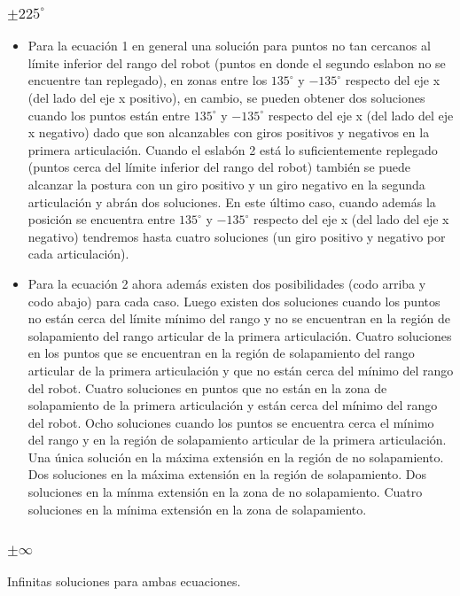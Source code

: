 \documentclass[a4paper,12pt]{article}
\begin{document}
\subsubsection{$\pm 225^\circ$}

\begin{itemize}
    \item Para la ecuación 1 en general una solución para puntos no tan cercanos al límite inferior del rango del robot (puntos en donde el segundo eslabon no se encuentre tan replegado), en zonas entre los $135^\circ$ y $-135^\circ$ respecto del eje x (del lado del eje x positivo), en cambio, se pueden obtener dos soluciones cuando los puntos están entre $135^\circ$ y $-135^\circ$ respecto del eje x (del lado del eje x negativo) dado que son alcanzables con giros positivos y negativos en la primera articulación. Cuando
    el eslabón 2 está lo suficientemente replegado (puntos cerca del límite inferior del rango del robot) también se puede alcanzar la postura con un giro positivo y un giro negativo en la segunda articulación y abrán dos soluciones. En este último caso, cuando además la posición se encuentra entre $135^\circ$ y $-135^\circ$ respecto del eje x (del lado del eje x negativo) tendremos hasta cuatro soluciones (un giro positivo y negativo por cada articulación).
    \item Para la ecuación 2 ahora además existen dos posibilidades (codo arriba y codo abajo) para cada caso. Luego existen dos soluciones cuando los puntos no están cerca del límite mínimo del rango y no se encuentran en la región de solapamiento del rango articular de la primera articulación. Cuatro soluciones en los puntos que se encuentran en la región de solapamiento del rango articular de la primera articulación y que no están cerca del mínimo del rango del robot. Cuatro soluciones en puntos que no están en la zona de solapamiento de la primera articulación y están cerca del mínimo del rango del robot. Ocho soluciones cuando los puntos se encuentra cerca el mínimo del rango y en la región de solapamiento articular de la primera articulación. Una única solución en la máxima extensión en la región de no solapamiento. Dos soluciones en la máxima extensión en la región de solapamiento. Dos soluciones en la mínma extensión en la zona de no solapamiento. Cuatro soluciones en la mínima extensión en la zona de solapamiento.
\end{itemize}

\subsubsection{$\pm \infty$}
Infinitas soluciones para ambas ecuaciones.
\end{document}
